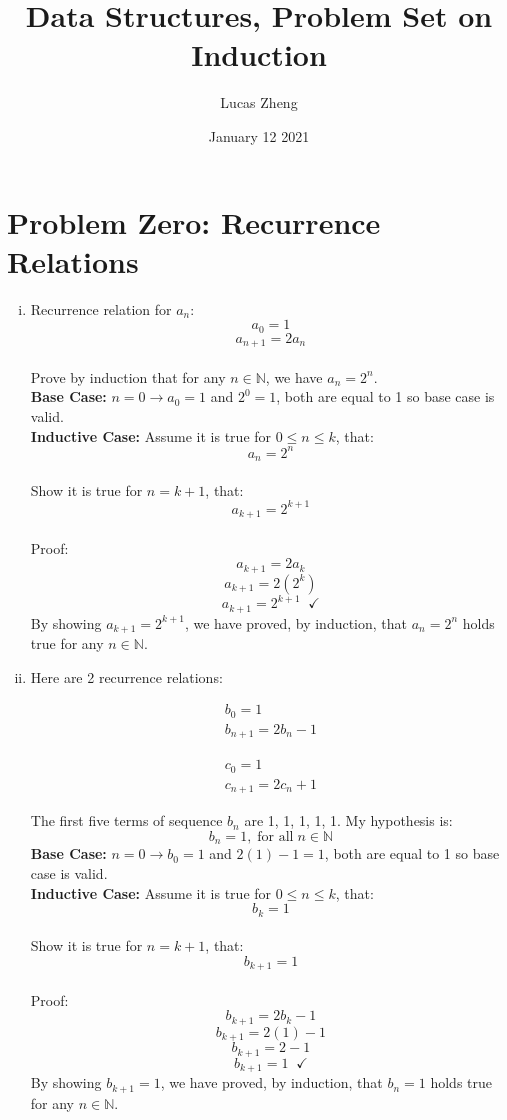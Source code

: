 \documentclass{article}
\title{Data Structures, Problem Set on Induction}
\author{Lucas Zheng}
\date{January 12 2021}
\begin{document}
\maketitle

\section*{Problem Zero: Recurrence Relations}
\begin{enumerate}[i.]
    \item Recurrence relation for $a_n$:
    $$a_0 = 1$$
    $$a_{n+1} = 2a_n$$
    \\Prove by induction that for any $n \in \mathbb{N}$, we have $a_n = 2^n$.
    \\\textbf{Base Case:} $n = 0 \to a_0 = 1$ and $2^0 = 1$, both are equal to 1 so base case is valid.
    \\\textbf{Inductive Case:} Assume it is true for $0 \leqslant n \leqslant k$, that:
    $$a_n = 2^n$$
    \\Show it is true for $n = k + 1$, that:
    $$a_{k+1} = 2^{k+1}$$
    \\Proof:
    $$a_{k+1} = 2a_k$$
    $$a_{k+1} = 2(2^k)$$
    $$a_{k+1} = 2^{k+1} \;\;\checkmark$$
    By showing $a_{k+1} = 2^{k+1}$, we have proved, by induction, that $a_n = 2^n$ holds true for any $n \in \mathbb{N}$.
    
    \item Here are 2 recurrence relations:\\
    \begin{minipage}{0.45\textwidth}
        \begin{align*}
            b_0 = 1\\
            b_{n+1} = 2b_n - 1
        \end{align*}
    \end{minipage}
    \begin{minipage}{0.45\textwidth}
        \begin{align*}
            c_0 = 1\\
            c_{n+1} = 2c_n + 1
        \end{align*}
    \end{minipage}
    
    The first five terms of sequence $b_n$ are 1, 1, 1, 1, 1. My hypothesis is:
    $$b_n = 1, \; \text{for all} \; n \in \mathbb{N}$$
    \textbf{Base Case:} $n = 0 \to b_0 = 1$ and $2(1) - 1 = 1$, both are equal to 1 so base case is valid.
    \\\textbf{Inductive Case:} Assume it is true for $0 \leqslant n \leqslant k$, that:
    $$b_k = 1$$
    \\Show it is true for $n = k + 1$, that:
    $$b_{k+1} = 1$$
    \\Proof:
    $$b_{k+1} = 2b_k - 1$$
    $$b_{k+1} = 2(1) - 1$$
    $$b_{k+1} = 2 - 1$$
    $$b_{k+1} = 1 \;\;\checkmark$$
    By showing $b_{k+1} = 1$, we have proved, by induction, that $b_n = 1$ holds true for any $n \in \mathbb{N}$.
    

\end{enumerate}
\end{document}
